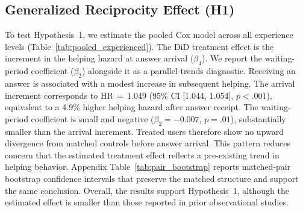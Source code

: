 \subsection{Generalized Reciprocity Effect (H1)}


To test Hypothesis~1, we estimate the pooled Cox model across all experience levels (Table~\ref{tab:pooled_experienced}). The DiD treatment effect is the increment in the helping hazard at answer arrival ($\beta_4$). We report the waiting-period coefficient ($\beta_2$) alongside it as a parallel-trends diagnostic. Receiving an answer is associated with a modest increase in subsequent helping. The arrival increment corresponds to HR\,$=$\,1.049 (95\% CI [1.044, 1.054], $p<.001$), equivalent to a 4.9\% higher helping hazard after answer receipt. The waiting-period coefficient is small and negative ($\beta_2=-0.007$, $p=.01$), substantially smaller than the arrival increment. Treated users therefore show no upward divergence from matched controls before answer arrival. This pattern reduces concern that the estimated treatment effect reflects a pre-existing trend in helping behavior. Appendix Table~\ref{tab:pair_bootstrap} reports matched-pair bootstrap confidence intervals that preserve the matched structure and support the same conclusion. Overall, the results support Hypothesis~1, although the estimated effect is smaller than those reported in prior observational studies.



